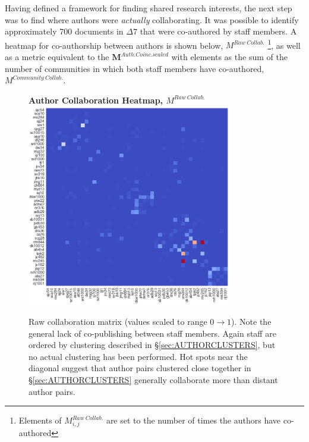 Having defined a framework for finding shared research interests, the next step was to find where authors were \emph{actually} collaborating. It was possible to identify approximately 700 documents in $\Delta7$ that were co-authored by staff members. A heatmap for co-authorship between authors is shown below, $M^{Raw\ Collab.}$ \footnote{Elements of $M^{Raw\ Collab.}_{i , j}$ are set to the number of times the authors have co-authored}, as well as a metric equivalent to the $\mathbf{M}^{Auth. Coinc.scaled}$ with elements as the sum of the number of communities in which both staff members have co-authored, $M^{Community\ Collab.}$.
\begin{figure}[H]
  \centering
  \textbf{Author Collaboration Heatmap, $M^{Raw\ Collab.}$}
    \includegraphics[width=0.8\textwidth]{Analysis/raw_collabs.png}
    \caption[Author Collaboration Heatmap]{Raw collaboration matrix (values scaled to range $0 \rightarrow 1$). Note the general lack of co-publishing between staff members. Again staff are ordered by clustering described in \S\ref{sec:AUTHORCLUSTERS}, but no actual clustering has been performed. Hot spots near the diagonal suggest that author pairs clustered close together in \S\ref{sec:AUTHORCLUSTERS} generally collaborate more than distant author pairs.}
      \label{fig:rawcollabs}
  \end{figure}
